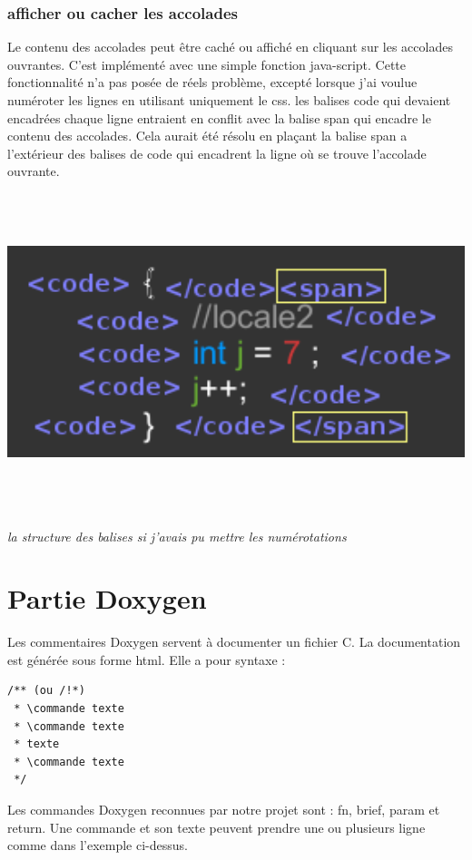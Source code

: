 \documentclass[10pt,a4paper]{report}
\begin{document}
\subsubsection*{afficher ou cacher les accolades}
Le contenu des accolades peut être caché ou affiché en cliquant sur les accolades ouvrantes. \newline
C'est implémenté avec une simple fonction java-script. \newline
Cette fonctionnalité n'a pas posée de réels problème, excepté lorsque j'ai voulue numéroter les lignes en utilisant uniquement le css. les balises code qui devaient encadrées chaque ligne entraient en conflit avec la balise span qui encadre le contenu des accolades. Cela aurait été résolu en plaçant la balise span a l'extérieur des balises de code qui encadrent la ligne où se trouve l'accolade ouvrante.
\includegraphics[height=10cm]{site/numerote.png} 
\textit{la structure des balises si j'avais pu mettre les numérotations}

\section{Partie Doxygen}

Les commentaires Doxygen servent à documenter un fichier C. La documentation est générée sous forme html. Elle a pour syntaxe :
\begin{verbatim}
/** (ou /!*)
 * \commande texte
 * \commande texte
 * texte
 * \commande texte
 */
\end{verbatim}

Les commandes Doxygen reconnues par notre projet sont : fn, brief, param et return. Une commande et son texte peuvent prendre une ou plusieurs ligne comme dans l'exemple ci-dessus.
\end{document}
